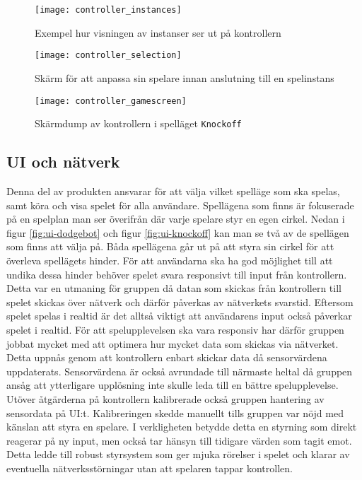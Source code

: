 \begin{figure}[h]
    \centering
    \texttt{[image: controller\_instances]}
    \caption{Exempel hur visningen av instanser ser ut på kontrollern}
    \label{fig:controller_instances}
\end{figure}

\begin{figure}[h]
    \centering
    \texttt{[image: controller\_selection]}
    \caption{Skärm för att anpassa sin spelare innan anslutning till en spelinstans}
    \label{fig:controller_selection}
\end{figure}

\begin{figure}[h]
    \centering
    \texttt{[image: controller\_gamescreen]}
    \caption{Skärmdump av kontrollern i spelläget \texttt{Knockoff}}
    \label{fig:controller_gamescreen}
\end{figure}

\subsection{UI och nätverk}
Denna del av produkten ansvarar för att välja vilket spelläge som ska spelas, samt köra och visa spelet för alla användare. Spellägena som finns är fokuserade på en spelplan man ser överifrån där varje spelare styr en egen cirkel. Nedan i figur \ref{fig:ui-dodgebot} och figur \ref{fig:ui-knockoff} kan man se två av de spellägen som finns att välja på. Båda spellägena går ut på att styra sin cirkel för att överleva spellägets hinder. För att användarna ska ha god möjlighet till att undika dessa hinder behöver spelet svara responsivt till input från kontrollern. Detta var en utmaning för gruppen då datan som skickas från kontrollern till spelet skickas över nätverk och därför påverkas av nätverkets svarstid. Eftersom spelet spelas i realtid är det alltså viktigt att användarens input också påverkar spelet i realtid. För att spelupplevelsen ska vara responsiv har därför gruppen jobbat mycket med att optimera hur mycket data som skickas via nätverket. Detta uppnås genom att kontrollern enbart skickar data då sensorvärdena uppdaterats. Sensorvärdena är också avrundade till närmaste heltal då gruppen ansåg att ytterligare upplösning inte skulle leda till en bättre spelupplevelse. Utöver åtgärderna på kontrollern kalibrerade också gruppen hantering av sensordata på UI:t. Kalibreringen skedde manuellt tills gruppen var nöjd med känslan att styra en spelare. I verkligheten betydde detta en styrning som direkt reagerar på ny input, men också tar hänsyn till tidigare värden som tagit emot. Detta ledde till robust styrsystem som ger mjuka rörelser i spelet och klarar av eventuella nätverksstörningar utan att spelaren tappar kontrollen. 


